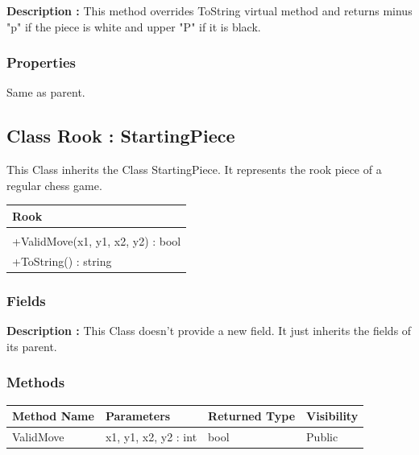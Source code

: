 \documentclass[12pt]{article}
\begin{document}
\textbf{Description :} This method overrides ToString virtual
method and returns minus "p" if the piece is white and upper "P"
if it is black.
\subsubsection{Properties}

Same as parent.
\newpage


\subsection{Class Rook : StartingPiece}

This Class inherits the Class StartingPiece. It represents the rook 
piece of a regular chess game.
\begin{table}[H]
    \begin{tabular}{|l|}
    \hline
    \cellcolor[HTML]{C0C0C0}\textbf{Rook} \\ \hline
    \cellcolor[HTML]{EFEFEF}                    \\ \hline
    +ValidMove(x1, y1, x2, y2) : bool           \\ \hline
    +ToString() : string                        \\ \hline
    \end{tabular}
\end{table}

\subsubsection{Fields}

\textbf{Description :} This Class doesn't provide a new field. It just
inherits the fields of its parent.

\subsubsection{Methods}

\begin{table}[H]
    \begin{tabular}{|l|l|l|l|}
    \hline
    \rowcolor[HTML]{EFEFEF} 
    \cellcolor[HTML]{EFEFEF}\textbf{Method Name} & \textbf{Parameters}  & \textbf{Returned Type} & \textbf{Visibility} \\ \hline
    ValidMove                          & x1, y1, x2, y2 : int & bool                   & Public              \\ \hline
    \end{tabular}
\end{table}
\end{document}

